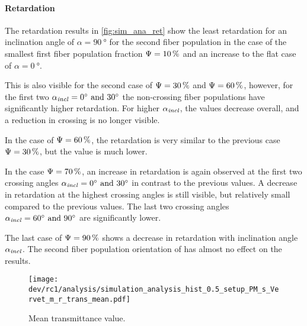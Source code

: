 \paragraph{Retardation}
The retardation results in \cref{fig:sim_ana_ret} show the least retardation for an inclination angle of $\alpha=\SI{90}{\degree}$ for the second fiber population in the case of the smallest first fiber population fraction $\textnormal{$\Psi$}=\SI{10}{\percent}$ and an increase to the flat case of $\alpha=\SI{0}{\degree}$.
\par
%
This is also visible for the second case of $\textnormal{$\Psi$}=\SI{30}{\percent}$ and $\textnormal{$\Psi$}=\SI{60}{\percent}$, however, for the first two $\modelInc = \SIlist{0;30}{\degree}$ the non-crossing fiber populations have significantly higher retardation.
For higher $\textnormal{$\alpha_{\mathit{incl}}$}$, the values decrease overall, and a reduction in crossing is no longer visible.
\par
%
In the case of $\textnormal{$\Psi$}=\SI{60}{\percent}$, the retardation is very similar to the previous case $\textnormal{$\Psi$}=\SI{30}{\percent}$, but the value is much lower.
\par
%
In the case $\textnormal{$\Psi$}=\SI{70}{\percent}$, an increase in retardation is again observed at the first two crossing angles $\modelInc=\SIlist{0;30}{\degree}$ in contrast to the previous values.
A decrease in retardation at the highest crossing angles is still visible, but relatively small compared to the previous values.
The last two crossing angles $\modelInc=\SIlist{60;90}{\degree}$ are significantly lower.
\par
%
The last case of $\textnormal{$\Psi$}=\SI{90}{\percent}$ shows a decrease in retardation with inclination angle $\textnormal{$\alpha_{\mathit{incl}}$}$.
The second fiber population orientation of has almost no effect on the results.
%
%
%
\begin{figure}[!p]
\centering
\texttt{[image: dev/rc1/analysis/simulation\_analysis\_hist\_0.5\_setup\_PM\_s\_Vervet\_m\_r\_trans\_mean.pdf]}
\caption{Mean transmittance value. }
\label{fig:sim_ana_trans}
\end{figure}
%

